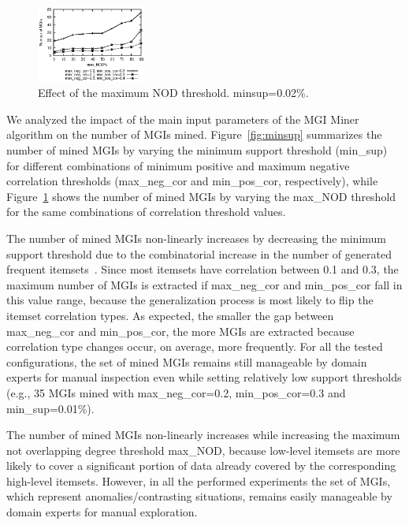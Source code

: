 \begin{figure}[t]
\centering
\includegraphics[width=0.32\textwidth]{chapters/mgi/grafici/EffectMaxNOD.eps}
\caption{Effect of the maximum NOD threshold. minsup=0.02\%.}
\label{fig:maxnod}
\end{figure}

We analyzed the impact of the main input parameters of the MGI Miner algorithm on the number of MGIs mined.
Figure~\ref{fig:minsup} summarizes the number of mined MGIs by varying the minimum support threshold (min\_sup) for different combinations of minimum positive and maximum negative correlation thresholds (max\_neg\_cor and  min\_pos\_cor, respectively), 
while Figure~\ref{fig:maxnod} shows the number of mined MGIs by varying the max\_NOD threshold for the same combinations of correlation threshold values.

The number of mined MGIs non-linearly increases by decreasing the minimum support threshold due to the combinatorial increase in the number of generated frequent itemsets~\cite{Agr94}. 
Since most itemsets have correlation between 0.1 and 0.3, the maximum number of MGIs is extracted if max\_neg\_cor and min\_pos\_cor fall in this value range, 
because the generalization process is most likely to flip the itemset correlation types. As expected, the smaller the gap between max\_neg\_cor and min\_pos\_cor, 
the more MGIs are extracted because correlation type changes occur, on average, more frequently. 
For all the tested configurations, the set of mined MGIs remains still manageable by domain experts for manual inspection even while setting relatively low support thresholds (e.g., 35 MGIs mined with max\_neg\_cor=0.2, min\_pos\_cor=0.3 and min\_sup=0.01\%). 

The number of mined MGIs non-linearly increases while increasing the maximum not overlapping degree threshold max\_NOD, because low-level itemsets are more likely to cover a significant portion of data already covered by the corresponding high-level itemsets. 
However, in all the performed experiments the set of MGIs, which represent anomalies/contrasting situations, remains easily manageable by domain experts for manual exploration. 

